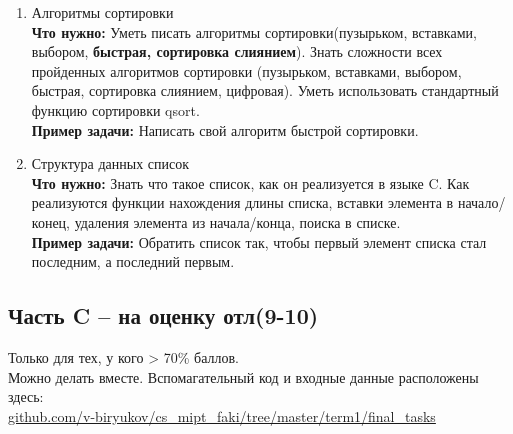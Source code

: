 \documentclass{article}
\begin{document}
\begin{enumerate}
\item Алгоритмы сортировки\\
\textbf{Что нужно:} Уметь писать алгоритмы сортировки(пузырьком, вставками, выбором, \textbf{быстрая, сортировка слиянием}). Знать сложности всех пройденных алгоритмов сортировки (пузырьком, вставками, выбором, быстрая, сортировка слиянием, цифровая). Уметь использовать стандартный функцию сортировки qsort.\\
\textbf{Пример задачи:} Написать свой алгоритм быстрой сортировки.

\item Структура данных список\\
\textbf{Что нужно:} Знать что такое список, как он реализуется в языке C. Как реализуются функции нахождения длины списка, вставки элемента в начало/конец, удаления элемента из начала/конца, поиска в списке.\\
\textbf{Пример задачи:} Обратить список так, чтобы первый элемент списка стал последним, а последний первым.

\end{enumerate}

\subsection*{Часть C -- на оценку отл(9-10)}
Только для тех, у кого > 70\% баллов. \\
Можно делать вместе. Вспомагательный код и входные данные расположены здесь:\\
\href{https://github.com/v-biryukov/cs_mipt_faki/tree/master/term1/final_tasks}{github.com/v-biryukov/cs\_mipt\_faki/tree/master/term1/final\_tasks}
\end{document}
